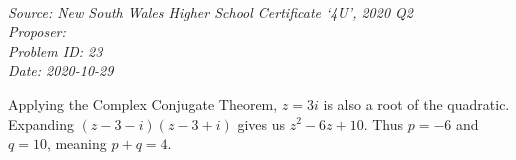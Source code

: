 \SSbreak\\
\emph{Source: New South Wales Higher School Certificate `4U', 2020 Q2}\\
\emph{Proposer: \Pbrain}\\
\emph{Problem ID: 23}\\
\emph{Date: 2020-10-29}\\
\SSbreak

\bigskip

\begin{solution}\hfil\medskip
    
    Applying the Complex Conjugate Theorem, $z=3  i$ is also a root of the quadratic. 
    Expanding $(z-3-i)(z-3+i)$ gives us $z^2-6z+10$. Thus $p = -6$ and $q = 10$, meaning $p + q = \boxed{4}$.
\end{solution}\bigskip